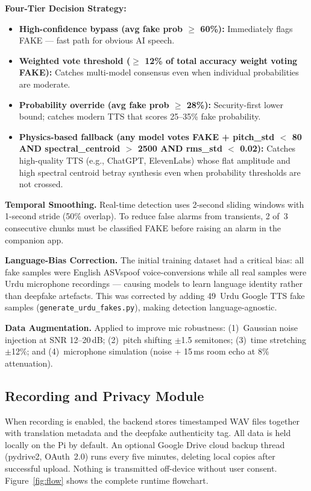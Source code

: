 \documentclass[10pt,twocolumn]{article}
\begin{document}
\textbf{Four-Tier Decision Strategy:}
\begin{itemize}[leftmargin=*,itemsep=2pt]
  \item \textbf{High-confidence bypass (avg fake prob $\geq$ 60\%):} Immediately
        flags FAKE — fast path for obvious AI speech.
  \item \textbf{Weighted vote threshold ($\geq$ 12\% of total accuracy weight
        voting FAKE):} Catches multi-model consensus even when individual
        probabilities are moderate.
  \item \textbf{Probability override (avg fake prob $\geq$ 28\%):} Security-first
        lower bound; catches modern TTS that scores 25–35\% fake probability.
  \item \textbf{Physics-based fallback (any model votes FAKE + pitch\_std $<$ 80
        AND spectral\_centroid $>$ 2500 AND rms\_std $<$ 0.02):} Catches
        high-quality TTS (e.g., ChatGPT, ElevenLabs) whose flat amplitude and
        high spectral centroid betray synthesis even when probability thresholds
        are not crossed.
\end{itemize}

\textbf{Temporal Smoothing.} Real-time detection uses 2-second sliding windows
with 1-second stride (50\% overlap). To reduce false alarms from transients,
2 of~3 consecutive chunks must be classified FAKE before raising an alarm in
the companion app.

\textbf{Language-Bias Correction.} The initial training dataset had a critical
bias: all fake samples were English ASVspoof voice-conversions while all real
samples were Urdu microphone recordings — causing models to learn language
identity rather than deepfake artefacts. This was corrected by adding 49~Urdu
Google TTS fake samples (\texttt{generate\_urdu\_fakes.py}), making detection
language-agnostic.

\textbf{Data Augmentation.} Applied to improve mic robustness:
(1)~Gaussian noise injection at SNR 12–20\,dB;
(2)~pitch shifting $\pm$1.5 semitones;
(3)~time stretching $\pm$12\%; and
(4)~microphone simulation (noise + 15\,ms room echo at 8\% attenuation).

\subsection{Recording and Privacy Module}
When recording is enabled, the backend stores timestamped WAV files together with
translation metadata and the deepfake authenticity tag. All data is held locally
on the Pi by default. An optional Google Drive cloud backup thread
(pydrive2, OAuth~2.0) runs every five minutes, deleting local copies after
successful upload. Nothing is transmitted off-device without user consent.
Figure~\ref{fig:flow} shows the complete runtime flowchart.
\end{document}

